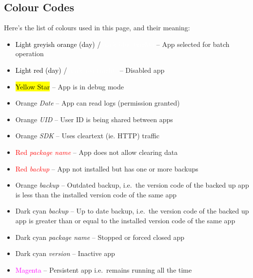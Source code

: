 \subsection{Colour Codes}\label{subsec:main-colour-codes}
Here's the list of colours used in this page, and their meaning:
\begin{itemize}
    \item \colorbox{AMLightGreyishOrange}{\textcolor{black}{Light greyish orange (day)}} / \colorbox{AMDarkBlue}{
        \textcolor{white}{dark blue (night)}} -- App selected for batch operation
    \item \colorbox{AMLightRed}{\textcolor{black}{Light red (day)}} / \colorbox{AMVeryDarkRed}{
        \textcolor{white}{dark red (night)}} -- Disabled app
    \item \colorbox{yellow}{\textcolor{black}{Yellow Star}} -- App is in debug mode
    \item \textcolor{AMOrange}{Orange \textit{Date}} -- App can read logs (permission granted)
    \item \textcolor{AMOrange}{Orange \textit{UID}} -- User ID is being shared between apps
    \item \textcolor{AMOrange}{Orange \textit{SDK}} -- Uses cleartext (ie. HTTP) traffic
    \item \textcolor{red}{Red \textit{package name}} -- App does not allow clearing data
    \item \textcolor{red}{Red \textit{backup}} -- App not installed but has one or more backups
    \item \textcolor{AMOrange}{Orange \textit{backup}} -- Outdated backup, i.e.\ the version code of the backed up app
        is less than the installed version code of the same app
    \item \textcolor{AMDarkCyan}{Dark cyan \textit{backup}} -- Up to date backup, i.e.\ the version code of the backed
        up app is greater than or equal to the installed version code of the same app
    \item \textcolor{AMDarkCyan}{Dark cyan \textit{package name}} -- Stopped or forced closed app
    \item \textcolor{AMDarkCyan}{Dark cyan \textit{version}} -- Inactive app
    \item \textcolor{magenta}{Magenta} -- Persistent app i.e.\ remains running all the time
\end{itemize}

